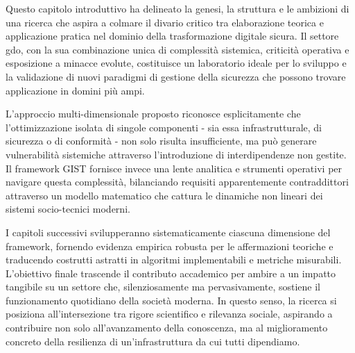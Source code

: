 Questo capitolo introduttivo ha delineato la genesi, la struttura e le ambizioni di una ricerca che aspira a colmare il divario critico tra elaborazione teorica e applicazione pratica nel dominio della trasformazione digitale sicura. Il settore \gls{gdo}, con la sua combinazione unica di complessità sistemica, criticità operativa e esposizione a minacce evolute, costituisce un laboratorio ideale per lo sviluppo e la validazione di nuovi paradigmi di gestione della sicurezza che possono trovare applicazione in domini più ampi.

L'approccio multi-dimensionale proposto riconosce esplicitamente che l'ottimizzazione isolata di singole componenti - sia essa infrastrutturale, di sicurezza o di conformità - non solo risulta insufficiente, ma può generare vulnerabilità sistemiche attraverso l'introduzione di interdipendenze non gestite. Il framework GIST fornisce invece una lente analitica e strumenti operativi per navigare questa complessità, bilanciando requisiti apparentemente contraddittori attraverso un modello matematico che cattura le dinamiche non lineari dei sistemi socio-tecnici moderni.

I capitoli successivi svilupperanno sistematicamente ciascuna dimensione del framework, fornendo evidenza empirica robusta per le affermazioni teoriche e traducendo costrutti astratti in algoritmi implementabili e metriche misurabili. L'obiettivo finale trascende il contributo accademico per ambire a un impatto tangibile su un settore che, silenziosamente ma pervasivamente, sostiene il funzionamento quotidiano della società moderna. In questo senso, la ricerca si posiziona all'intersezione tra rigore scientifico e rilevanza sociale, aspirando a contribuire non solo all'avanzamento della conoscenza, ma al miglioramento concreto della resilienza di un'infrastruttura da cui tutti dipendiamo.

\clearpage
\printbibliography[
    heading=subbibliography,
    title={Riferimenti Bibliografici del Capitolo 1},
]

